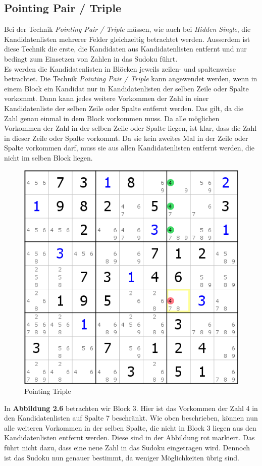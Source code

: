 \newpage
\subsection{Pointing Pair / Triple}
Bei der Technik \textit{Pointing Pair / Triple} müssen, wie auch bei \textit{Hidden Single}, die Kandidatenlisten mehrerer Felder gleichzeitig betrachtet werden. Ausserdem ist diese Technik die erste, die Kandidaten aus Kandidatenlisten entfernt und nur bedingt zum Einsetzen von Zahlen in das Sudoku führt.\\
Es werden die Kandidatenlisten in Blöcken jeweils zeilen- und spaltenweise betrachtet. Die Technik \textit{Pointing Pair / Triple}
kann angewendet werden, wenn in einem Block ein Kandidat nur in Kandidatenlisten der selben Zeile oder Spalte vorkommt. Dann kann jedes weitere Vorkommen der Zahl in einer Kandidatenliste der selben Zeile oder Spalte entfernt werden. Das gilt, da die Zahl genau einmal in dem Block vorkommen muss. Da alle möglichen Vorkommen der Zahl in der selben Zeile oder Spalte liegen, ist klar, dass die Zahl in dieser Zeile oder Spalte vorkommt. Da sie kein zweites Mal in der Zeile oder Spalte vorkommen darf, muss sie aus allen Kandidatenlisten entfernt werden, die nicht im selben Block liegen.

\begin{figure}[h]
\begin{center}
\includegraphics{./img/pointing_triple.png}
\caption{Pointing Triple}
\end{center}
\end{figure}

\noindent In \textbf{Abbildung 2.6} betrachten wir Block 3. Hier ist das Vorkommen der Zahl 4 in den Kandidatenlisten auf Spalte 7 beschränkt. Wie oben beschrieben, können nun alle weiteren Vorkommen in der selben Spalte, die nicht in Block 3 liegen aus den Kandidatenlisten entfernt werden. Diese sind in der Abbildung rot markiert. Das führt nicht dazu, dass eine neue Zahl in das Sudoku eingetragen wird. Dennoch ist das Sudoku nun genauer bestimmt, da weniger Möglichkeiten übrig sind.